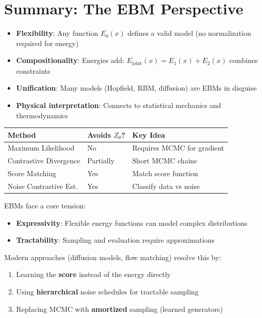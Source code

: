 \section{Summary: The EBM Perspective}

\begin{remark}\leavevmode
    \begin{itemize}
        \item \textbf{Flexibility}: Any function $E_\theta(x)$ defines a valid model (no normalization required for energy)
        \item \textbf{Compositionality}: Energies add: $E_{\text{joint}}(x) = E_1(x) + E_2(x)$ combines constraints
        \item \textbf{Unification}: Many models (Hopfield, RBM, diffusion) are EBMs in disguise
        \item \textbf{Physical interpretation}: Connects to statistical mechanics and thermodynamics
    \end{itemize}
\end{remark}

\begin{remark}\leavevmode
    \begin{center}
    \begin{tabular}{lll}
        \hline
        \textbf{Method} & \textbf{Avoids $Z_\theta$?} & \textbf{Key Idea} \\
        \hline
        Maximum Likelihood & No & Requires MCMC for gradient \\
        Contrastive Divergence & Partially & Short MCMC chains \\
        Score Matching & Yes & Match score function \\
        Noise Contrastive Est. & Yes & Classify data vs noise \\
        \hline
    \end{tabular}
    \end{center}
\end{remark}

\begin{remark}
    EBMs face a core tension:
    \begin{itemize}
        \item \textbf{Expressivity}: Flexible energy functions can model complex distributions
        \item \textbf{Tractability}: Sampling and evaluation require approximations
    \end{itemize}
    Modern approaches (diffusion models, flow matching) resolve this by:
    \begin{enumerate}
        \item Learning the \textbf{score} instead of the energy directly
        \item Using \textbf{hierarchical} noise schedules for tractable sampling
        \item Replacing MCMC with \textbf{amortized} sampling (learned generators)
    \end{enumerate}
\end{remark}

